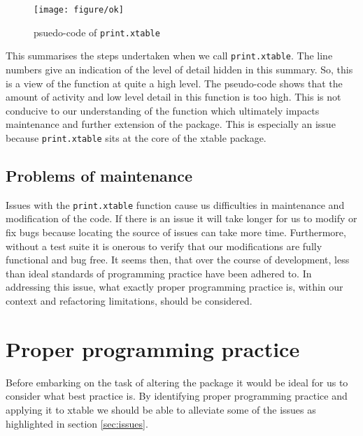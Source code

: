\documentclass{memoir}\usepackage[]{graphicx}\usepackage[]{color}
\newenvironment{knitrout}{}{} %
\newcommand{\pkg}[1]{{\fontseries{b}\selectfont #1}}
\let\code=\texttt
\begin{document}
\begin{figure}[h!]
\begin{knitrout}
\color{fgcolor}

{\centering \texttt{[image: figure/ok]} 

}



\end{knitrout}
	\caption{psuedo-code of \code{print.xtable}}\label{fig:pseudo}
\end{figure}


 This summarises the steps undertaken when we call \code{print.xtable}. The line numbers give an indication of the level of detail hidden in this summary. So, this is a view of the function at quite a high level. The pseudo-code shows that the amount of activity and low level detail in this function is too high. This is not conducive to our understanding of the function which ultimately impacts maintenance and further extension of the package. This is especially an issue because \code{print.xtable} sits at the core of the \pkg{xtable} package.
 
 
\subsection{Problems of maintenance}

Issues with the \code{print.xtable} function cause us difficulties in maintenance and modification of the code. If there is an issue it will take longer for us to modify or fix bugs because locating the source of issues can take more time. Furthermore, without a test suite it is onerous to verify that our modifications are fully functional and bug free. It seems then, that over the course of development, less than ideal standards of programming practice have been adhered to. 
In addressing this issue, what exactly proper programming practice is, within our context and refactoring limitations, should be considered.

\section{Proper programming practice}\label{sec:practice}

Before embarking on the task of altering the package it would be ideal for us to consider what best practice is. By identifying proper programming practice and applying it to \pkg{xtable} we should be able to alleviate some of the issues as highlighted in section \ref{sec:issues}.
\end{document}
